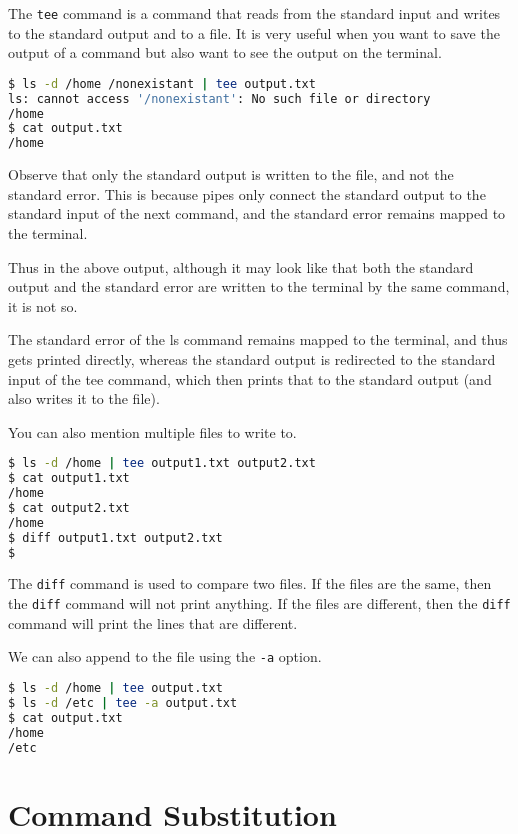 The \lstinline|tee| command is a command that reads from the 
standard input and writes to the standard output and to a file.
It is very useful when you want to save the output of a command
but also want to see the output on the terminal.

\begin{lstlisting}[language=bash]
$ ls -d /home /nonexistant | tee output.txt
ls: cannot access '/nonexistant': No such file or directory
/home
$ cat output.txt
/home
\end{lstlisting}

Observe that only the standard output is written to the file, and
not the standard error. This is because pipes only connect the
standard output to the standard input of the next command, and the
standard error remains mapped to the terminal.

Thus in the above output, although it may look like that both
the standard output and the standard error are written to the
terminal by the same command, it is not so.

The standard error of the ls command remains mapped to the terminal,
and thus gets printed directly, whereas the standard output is
redirected to the standard input of the tee command, which then
prints that to the standard output (and also writes it to the file).

You can also mention multiple files to write to.

\begin{lstlisting}[language=bash]
$ ls -d /home | tee output1.txt output2.txt
$ cat output1.txt
/home
$ cat output2.txt
/home
$ diff output1.txt output2.txt
$
\end{lstlisting}

\begin{remark}
  The \lstinline|diff| command is used to compare two files. If the
  files are the same, then the \lstinline|diff| command will not print
  anything. If the files are different, then the \lstinline|diff| command
  will print the lines that are different.
\end{remark}

We can also append to the file using the \lstinline|-a| option.

\begin{lstlisting}[language=bash]
$ ls -d /home | tee output.txt
$ ls -d /etc | tee -a output.txt
$ cat output.txt
/home
/etc
\end{lstlisting}

\section{Command Substitution}

